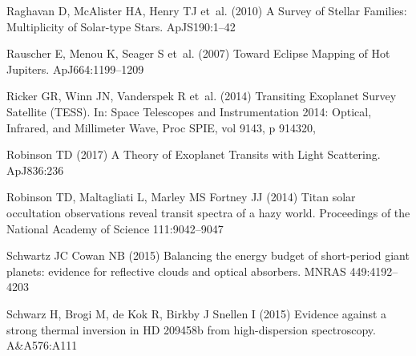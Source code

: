 \documentclass[graybox,natbib,nosecnum]{svmult}
\newcommand*\aap{A\&A}
\newcommand*\apj{ApJ}
\newcommand*\apjs{ApJS}
\newcommand*\mnras{MNRAS}
\newcommand*\procspie{Proc SPIE}
\begin{document}
\begin{thebibliography}{110}
{Raghavan} D, {McAlister} HA, {Henry} TJ et~al. (2010) {A Survey of Stellar
  Families: Multiplicity of Solar-type Stars}. \apjs 190:1--42

{Rauscher} E, {Menou} K, {Seager} S et~al. (2007) {Toward Eclipse Mapping of
  Hot Jupiters}. \apj 664:1199--1209

{Ricker} GR, {Winn} JN, {Vanderspek} R et~al. (2014) {Transiting Exoplanet
  Survey Satellite (TESS)}. In: Space Telescopes and Instrumentation 2014:
  Optical, Infrared, and Millimeter Wave, \procspie, vol 9143, p 914320,

{Robinson} TD (2017) {A Theory of Exoplanet Transits with Light Scattering}.
  \apj 836:236

{Robinson} TD, {Maltagliati} L, {Marley} MS {Fortney} JJ (2014) {Titan solar
  occultation observations reveal transit spectra of a hazy world}. Proceedings
  of the National Academy of Science 111:9042--9047

{Schwartz} JC {Cowan} NB (2015) {Balancing the energy budget of short-period
  giant planets: evidence for reflective clouds and optical absorbers}. \mnras
  449:4192--4203

{Schwarz} H, {Brogi} M, {de Kok} R, {Birkby} J {Snellen} I (2015) {Evidence
  against a strong thermal inversion in HD 209458b from high-dispersion
  spectroscopy}. \aap 576:A111


\end{thebibliography}
\end{document}
